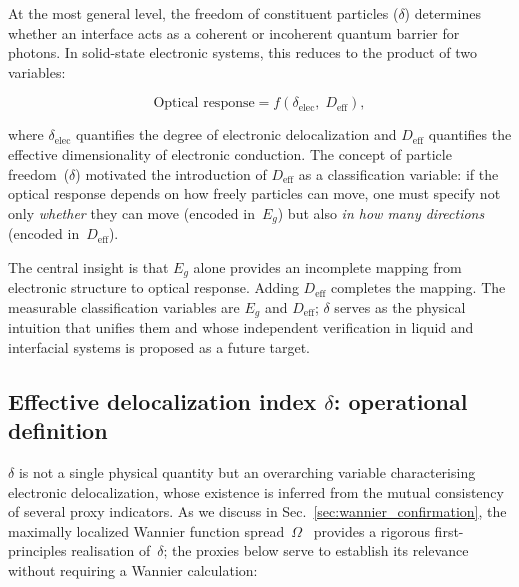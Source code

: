 \documentclass[twocolumn,showpacs,preprintnumbers,amsmath,amssymb,prb]{revtex4-2}
\begin{document}
At the most general level, the freedom of constituent particles
($\delta$) determines whether an interface acts as a coherent or
incoherent quantum barrier for photons. In solid-state electronic
systems, this reduces to the product of two variables:

\begin{equation}
  \text{Optical response} = f\!\left(\delta_\mathrm{elec},\;
  D_\mathrm{eff}\right),
  \label{eq:causal}
\end{equation}

\noindent where $\delta_\mathrm{elec}$ quantifies the degree of
electronic delocalization and $D_\mathrm{eff}$ quantifies the effective
dimensionality of electronic conduction. The concept of particle
freedom~($\delta$) motivated the introduction of $D_\mathrm{eff}$ as a
classification variable: if the optical response depends on how freely
particles can move, one must specify not only \emph{whether} they can
move (encoded in~$E_g$) but also \emph{in how many directions}
(encoded in~$D_\mathrm{eff}$).

The central insight is that $E_g$ alone provides an incomplete mapping
from electronic structure to optical response. Adding $D_\mathrm{eff}$
completes the mapping. The measurable classification variables are
$E_g$ and $D_\mathrm{eff}$; $\delta$ serves as the physical intuition
that unifies them and whose independent verification in liquid and
interfacial systems is proposed as a future target.

\subsection{Effective delocalization index $\delta$: operational definition}

$\delta$ is not a single physical quantity but an overarching variable
characterising electronic delocalization,
whose existence is inferred from the mutual consistency of several proxy
indicators.
As we discuss in Sec.~\ref{sec:wannier_confirmation}, the maximally
localized Wannier function spread~$\Omega$~\cite{Marzari1997}
provides a rigorous first-principles realisation of~$\delta$;
the proxies below serve to establish its relevance without
requiring a Wannier calculation:
\end{document}

